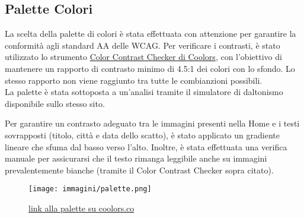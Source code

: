 \subsection{Palette Colori}
La scelta della palette di colori è stata effettuata con attenzione per garantire la conformità agli standard AA delle WCAG. Per verificare i contrasti, è stato utilizzato lo strumento \href{https://coolors.co/contrast-checker}{Color Contrast Checker di Coolors}, con l’obiettivo di mantenere un rapporto di contrasto minimo di 4.5:1 dei colori con lo sfondo.
Lo stesso rapporto non viene raggiunto tra tutte le combianzioni possibili.\\
La palette è stata sottoposta a un’analisi tramite il simulatore di daltonismo disponibile sullo stesso sito.

Per garantire un contrasto adeguato tra le immagini presenti nella Home e i testi sovrapposti (titolo, città e data dello scatto), è stato applicato un gradiente lineare che sfuma dal basso verso l'alto. Inoltre, è stata effettuata una verifica manuale per assicurarsi che il testo rimanga leggibile anche su immagini prevalentemente bianche (tramite il Color Contrast Checker sopra citato).

\begin{figure}[h]
    \centering
    \texttt{[image: immagini/palette.png]}
    \caption{\href{https://coolors.co/030303-fefefe-f78e69-23b5d3}{link alla palette su coolors.co}}
    \label{fig:palette}
\end{figure}